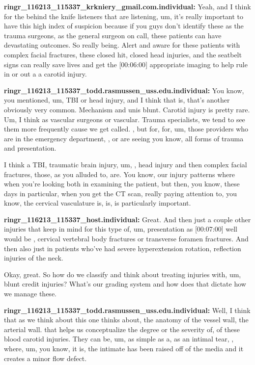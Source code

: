 \documentclass[
]{book}
\begin{document}
\textbf{ringr\_116213\_115337\_krkniery\_gmail.com.individual:} Yeah, and I think
for the behind the knife listeners that are listening, um, it's really
important to have this high index of suspicion because if you guys don't
identify these as the trauma surgeons, as the general surgeon on call,
these patients can have devastating outcomes. So really being. Alert and
aware for these patients with complex facial fractures, these closed
hit, closed head injuries, and the seatbelt signs can really save lives
and get the {[}00:06:00{]} appropriate imaging to help rule in or out a a
carotid injury.

\textbf{ringr\_116213\_115337\_todd.rasmussen\_uss.edu.individual:} You know, you
mentioned, um, TBI or head injury, and I think that is, that's another
obviously very common. Mechanism and unis blunt. Carotid injury is
pretty rare. Um, I think as vascular surgeons or vascular. Trauma
specialists, we tend to see them more frequently cause we get called. ,
but for, for, um, those providers who are in the emergency department, ,
or are seeing you know, all forms of trauma and presentation.

I think a TBI, traumatic brain injury, um, , head injury and then
complex facial fractures, those, as you alluded to, are. You know, our
injury patterns where when you're looking both in examining the patient,
but then, you know, these days in particular, when you get the CT scan,
really paying attention to, you know, the cervical vasculature is, is,
is particularly important.

\textbf{ringr\_116213\_115337\_host.individual:} Great. And then just a couple
other injuries that keep in mind for this type of, um, presentation as
{[}00:07:00{]} well would be , cervical vertebral body fractures or
transverse foramen fractures. And then also just in patients who've had
severe hyperextension rotation, reflection injuries of the neck.

Okay, great. So how do we classify and think about treating injuries
with, um, blunt credit injuries? What's our grading system and how does
that dictate how we manage these.

\textbf{ringr\_116213\_115337\_todd.rasmussen\_uss.edu.individual:} Well, I think
that as we think about this one thinks about, the anatomy of the vessel
wall, the arterial wall. that helps us conceptualize the degree or the
severity of, of these blood carotid injuries. They can be, um, as simple
as a, as an intimal tear, , where, um, you know, it is, the intimate has
been raised off of the media and it creates a minor flow defect.
\end{document}
